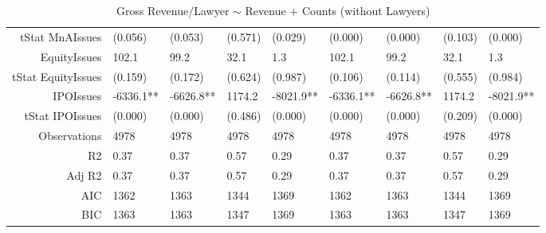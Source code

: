 \begin{table}[ht]
\begin{tabular}{rllllllll}
  tStat MnAIssues & (0.056) & (0.053) & (0.571) & (0.029) & (0.000) & (0.000) & (0.103) & (0.000) \\ 
  EquityIssues & 102.1 & 99.2 & 32.1 & 1.3 & 102.1 & 99.2 & 32.1 & 1.3 \\ 
  tStat EquityIssues & (0.159) & (0.172) & (0.624) & (0.987) & (0.106) & (0.114) & (0.555) & (0.984) \\ 
  IPOIssues & -6336.1** & -6626.8** & 1174.2 & -8021.9** & -6336.1** & -6626.8** & 1174.2 & -8021.9** \\ 
  tStat IPOIssues & (0.000) & (0.000) & (0.486) & (0.000) & (0.000) & (0.000) & (0.209) & (0.000) \\ 
  Observations & 4978 & 4978 & 4978 & 4978 & 4978 & 4978 & 4978 & 4978 \\ 
  R2 & 0.37 & 0.37 & 0.57 & 0.29 & 0.37 & 0.37 & 0.57 & 0.29 \\ 
  Adj R2 & 0.37 & 0.37 & 0.57 & 0.29 & 0.37 & 0.37 & 0.57 & 0.29 \\ 
  AIC & 1362 & 1363 & 1344 & 1369 & 1362 & 1363 & 1344 & 1369 \\ 
  BIC & 1363 & 1363 & 1347 & 1369 & 1363 & 1363 & 1347 & 1369 \\ 
   \hline
\end{tabular}
\caption{Gross Revenue/Lawyer $\sim$ Revenue + Counts (without Lawyers)} 
\end{table}

